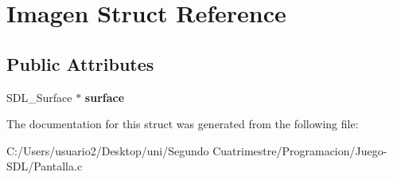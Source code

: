 \hypertarget{struct_imagen}{}\section{Imagen Struct Reference}
\label{struct_imagen}
\subsection*{Public Attributes}
\begin{DoxyCompactItemize}
\item 
S\+D\+L\+\_\+\+Surface $\ast$ {\bfseries surface}\hypertarget{struct_imagen_aecc28b21f6138fed7fa9355990031d68}{}\label{struct_imagen_aecc28b21f6138fed7fa9355990031d68}

\end{DoxyCompactItemize}


The documentation for this struct was generated from the following file\+:\begin{DoxyCompactItemize}
\item 
C\+:/\+Users/usuario2/\+Desktop/uni/\+Segundo Cuatrimestre/\+Programacion/\+Juego-\/\+S\+D\+L/Pantalla.\+c\end{DoxyCompactItemize}
